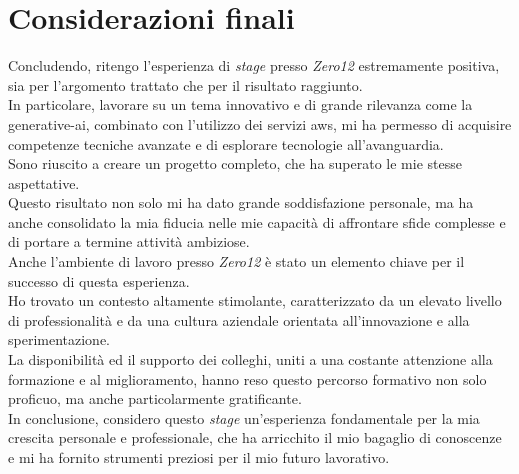 \section{Considerazioni finali}
\label{sec:considetazioni-finali}

Concludendo, ritengo l’esperienza di \textit{stage} presso \textit{Zero12} estremamente positiva, sia per l’argomento trattato che per il risultato raggiunto.\\
In particolare, lavorare su un tema innovativo e di grande rilevanza come la \gls{generative-ai}, combinato con l’utilizzo dei servizi \gls{aws}, mi ha permesso di acquisire competenze tecniche avanzate e di esplorare tecnologie all’avanguardia. \\ 

\noindent Sono riuscito a creare un progetto completo, che ha superato le mie stesse aspettative.\\
Questo risultato non solo mi ha dato grande soddisfazione personale, ma ha anche consolidato la mia fiducia nelle mie capacità di affrontare sfide complesse e di portare a termine attività ambiziose.\\  

\noindent Anche l’ambiente di lavoro presso \textit{Zero12} è stato un elemento chiave per il successo di questa esperienza.\\
Ho trovato un contesto altamente stimolante, caratterizzato da un elevato livello di professionalità e da una cultura aziendale orientata all’innovazione e alla sperimentazione.\\
La disponibilità ed il supporto dei colleghi, uniti a una costante attenzione alla formazione e al miglioramento, hanno reso questo percorso formativo non solo proficuo, ma anche particolarmente gratificante. \\

\noindent In conclusione, considero questo \textit{stage} un’esperienza fondamentale per la mia crescita personale e professionale, che ha arricchito il mio bagaglio di conoscenze e mi ha fornito strumenti preziosi per il mio futuro lavorativo.